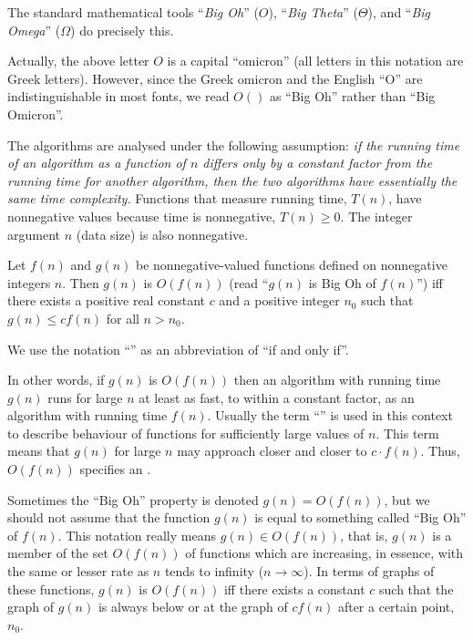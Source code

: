 The standard mathematical tools ``\emph{Big Oh}'' ($O$), ``\emph{Big
Theta}'' ($\Theta$), and ``\emph{Big Omega}'' ($\Omega$) do 
precisely this.

\begin{note}
Actually, the above letter $O$ is a capital ``omicron''  (all
letters in this notation are Greek letters). However, since the Greek
omicron and the English ``O'' are indistinguishable in most fonts, we
read $O()$ as ``Big Oh'' rather than ``Big Omicron''. 
\end{note}

The algorithms are analysed under the following assumption: \emph{if
the running time of an algorithm as a function of $n$ differs only by a
constant factor from the  running time for another algorithm, then the
two algorithms have essentially the same time complexity.} Functions that
measure running time, $T(n)$, have nonnegative values because time is
nonnegative, $T(n) \ge 0$. The integer argument $n$ (data size) is also
nonnegative.

\begin{Definition} [Big Oh]
\label{def:oh}
Let $f(n)$ and $g(n)$ be nonnegative-valued functions defined on
nonnegative integers $n$. Then $g(n)$ is $O(f(n))$ (read ``\(g(n)\) is
Big Oh of \(f(n)\)'') iff there exists 
a positive real constant $c$ and
a positive integer $n_{0}$ such that $g(n) \le c f(n)$ for all $n>n_{0}$.
\end{Definition}
\begin{note} 
We use the notation ``'' as an abbreviation of ``if and only if''.
\end{note}
In other words, if $g(n)$ is $O(f(n))$ then an algorithm with running time 
$g(n)$ runs for large $n$ at least as fast, to within a
constant factor, as an algorithm with running time  $f(n)$. Usually
the term ``'' is used in this context to describe 
behaviour of functions for sufficiently large values of $n$. This term 
means that \(g(n)\) for large \(n\) may approach closer and closer to 
\(c\cdot f(n)\). Thus, \(O(f(n))\) specifies
an .
\begin{note} 
Sometimes the ``Big Oh'' property is denoted $g(n)=O(f(n))$, but
we should not assume that the function $g(n)$ is equal to something 
called ``Big Oh'' of $f(n)$. This notation really means $g(n) \in O(f(n))$, 
that is, \(g(n)\) is a member of the set $O(f(n))$ 
of functions which are increasing, in essence, with the same 
or lesser rate as  \(n\) tends to infinity ($n \rightarrow \infty$). 
In terms of graphs of these functions, $g(n)$ is $O(f(n))$ iff
there exists a constant $c$ such that the graph of $g(n)$ is always
below or at the graph of $cf(n)$ after a certain point, $n_{0}$. 
\end{note}

